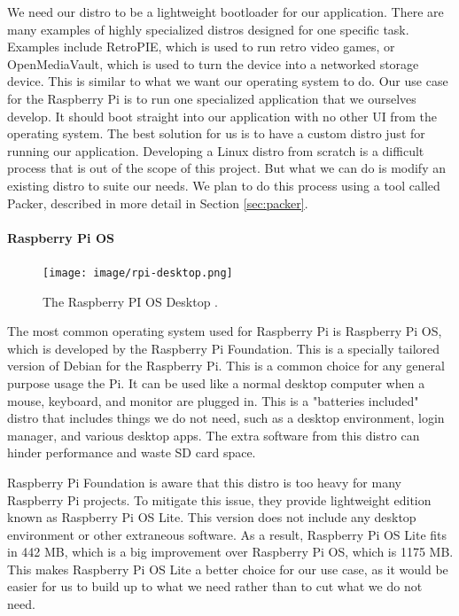 We need our distro to be a lightweight bootloader for our application. There are many
examples of highly specialized distros designed for one specific task. Examples
include RetroPIE, which is used to run retro video games, or OpenMediaVault, which is used
to turn the device into a networked storage device. This is similar to what we want our
operating system to do. Our use case for the Raspberry Pi is to run one specialized
application that we ourselves develop. It should boot straight into our application with
no other UI from the operating system. The best solution for us is to have a custom distro
just for running our application. Developing a Linux distro from scratch is a difficult
process that is out of the scope of this project. But what we can do is modify an existing
distro to suite our needs. We plan to do this process using a tool called Packer,
described in more detail in Section \ref{sec:packer}.

\paragraph{Raspberry Pi OS}

\begin{figure}[h!]
  \centering
  \texttt{[image: image/rpi-desktop.png]}
  \caption{The Raspberry PI OS Desktop \autocite{rpi-desktop}.}
  \label{fig:rpios}
\end{figure}

The most common operating system used for Raspberry Pi is Raspberry Pi OS, which is
developed by the Raspberry Pi Foundation. This is a specially tailored version of Debian
for the Raspberry Pi. This is a common choice for any general purpose usage the Pi. It can
be used like a normal desktop computer when a mouse, keyboard, and monitor are plugged in.
This is a "batteries included" distro that includes things we do not need, such as a
desktop environment, login manager, and various desktop apps. The extra software from this
distro can hinder performance and waste SD card space.

Raspberry Pi Foundation is aware that this distro is too heavy for many Raspberry Pi
projects. To mitigate this issue, they provide lightweight edition known as Raspberry Pi
OS Lite. This version does not include any desktop environment or other extraneous
software. As a result, Raspberry Pi OS Lite fits in 442 MB, which is a big improvement
over Raspberry Pi OS, which is 1175 MB. This makes Raspberry Pi OS Lite a better choice
for our use case, as it would be easier for us to build up to what we need rather than to
cut what we do not need.

